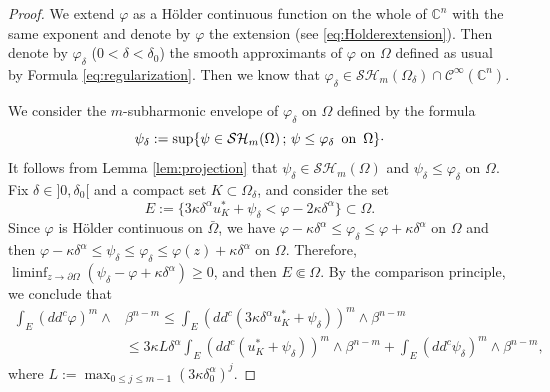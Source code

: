 \documentclass[JEP,XML,SOM,Unicode]{cedram}
\newcommand{\sep}{\,;\,}
\theoremstyle{definition}
\renewcommand{\C}{\mathbb{C}}
\newcommand{\Cc}{\mathcal{C}}
\begin{document}
\begin{proof}
We extend $\varphi$ as a Hölder continuous function on the whole of $\C^n$ with the same exponent and denote by $\varphi$ the extension (see \eqref{eq:Holderextension}).
Then denote by $\varphi_{\delta}$ ($0 < \delta < \delta_0$) the smooth approximants of $\varphi $ on $\Omega$ defined as usual by Formula \eqref{eq:regularization}. Then we know that $\varphi_\delta \in \mathcal{SH}_m (\Omega_{\delta})\cap\Cc^{\infty}(\C^n)$.

We consider the $m$-subharmonic envelope of $\varphi_\delta$ on $\Omega$ defined by the formula
\[
\psi_\delta:= \sup \{\psi \in \mathcal{SH}_m (\Omega) \sep \psi \leq \varphi_\delta \, \, \, \hbox{on} \, \, \, \Omega \}\cdot
\]
It follows from Lemma \ref{lem:projection} that $\psi_\delta \in \mathcal{SH}_m (\Omega)$ and $\psi_\delta \leq \varphi_\delta $ on $\Omega$. Fix $\delta \in{}]0, \delta _0[$ and a compact set $K \subset \Omega_\delta$, and consider the set
\[
E:=\{3 \kappa \delta^\alpha u_K^*+ \psi_\delta<\varphi- 2 \kappa \delta^{\alpha}\} \subset \Omega.
\]
Since $\varphi $ is Hölder continuous on $\bar \Omega$, we have $\varphi - \kappa \delta^\alpha\leq \varphi_{\delta} \leq \varphi + \kappa \delta^{\alpha}$ on $\Omega$ and then $\varphi - \kappa \delta^\alpha \leq \psi_\delta \leq \varphi_{\delta} \leq \varphi (z) + \kappa \delta^\alpha$ on $\Omega$.
Therefore, $\liminf_{z \to \partial \Omega} (\psi_\delta - \varphi + \kappa \delta^\alpha ) \geq 0$, and then $E \Subset \Omega$. By the comparison principle, we conclude that
\begin{equation}\label{eq:fundmentalestimate}
\begin{split}
\int_{E}(dd^c\varphi)^m\wedge&\beta^{n-m} \leq \int_{E}(dd^c(3 \kappa \delta^\alpha u_K^* + \psi_{\delta}))^m\wedge\beta^{n-m} \\
& \leq 3 \kappa L \delta^\alpha \int_{E}(dd^c(u_K^* + \psi_{\delta}))^m\wedge\beta^{n-m}+\int_{E}(dd^c\psi_{\delta})^m\wedge\beta^{n-m},
\end{split}
\end{equation}
where $L:= \max_{0 \leq j \leq m - 1} (3 \kappa \delta_0^\alpha)^j$.


\end{proof}
\end{document}
